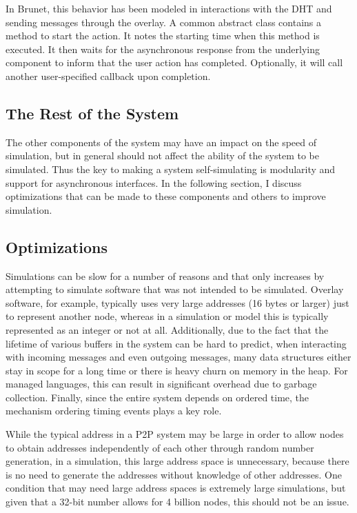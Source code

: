 In Brunet, this behavior has been modeled in interactions with the DHT and
sending messages through the overlay.  A common abstract class contains a
method to start the action.  It notes the starting time when this method is
executed.  It then waits for the asynchronous response from the underlying
component to inform that the user action has completed.  Optionally, it will
call another user-specified callback upon completion.

\subsection{The Rest of the System}

The other components of the system may have an impact on the speed of
simulation, but in general should not affect the ability of the system to be
simulated.  Thus the key to making a system self-simulating is modularity and
support for asynchronous interfaces.  In the following section, I discuss
optimizations that can be made to these components and others to improve
simulation.

\subsection{Optimizations}

Simulations can be slow for a number of reasons and that only increases by
attempting to simulate software that was not intended to be simulated.  Overlay
software, for example, typically uses very large addresses (16 bytes or larger)
just to represent another node, whereas in a simulation or model this is
typically represented as an integer or not at all.  Additionally, due to the
fact that the lifetime of various buffers in the system can be hard to predict,
when interacting with incoming messages and even outgoing messages, many data
structures either stay in scope for a long time or there is heavy churn on
memory in the heap.  For managed languages, this can result in significant
overhead due to garbage collection.  Finally, since the entire system depends
on ordered time, the mechanism ordering timing events plays a key role.

While the typical address in a P2P system may be large in order to allow nodes
to obtain addresses independently of each other through random number
generation, in a simulation, this large address space is unnecessary, because
there is no need to generate the addresses without knowledge of other
addresses.  One condition that may need large address spaces is extremely large
simulations, but given that a 32-bit number allows for 4 billion nodes, this
should not be an issue.

